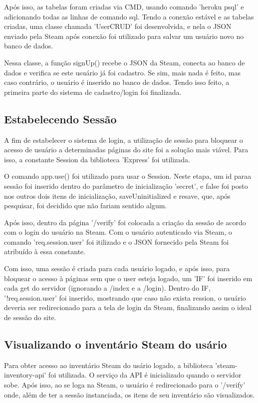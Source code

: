 Após isso, as tabelas foram criadas via CMD, usando comando 'heroku psql' e adicionando todas as linhas de comando sql.
Tendo a conexão estável e as tabelas criadas, uma classe chamada 'UserCRUD' foi desenvolvida, e nela o JSON 
enviado pela Steam após conexão foi utilizado para salvar um usuário novo no banco de dados.

Nessa classe, a função signUp() recebe o JSON da Steam, conecta ao banco de dados e verifica se este usuário 
já foi cadastro. Se sim, mais nada é feito, mas caso contrário, o usuário é inserido no banco de dados.
Tendo isso feito, a primeira parte do sistema de cadastro/login foi finalizada.

\subsection{Estabelecendo Sessão}
A fim de estabelecer o sistema de login, a utilização de sessão para bloquear o acesso de usuário a 
determinadas páginas do site foi a solução mais viável. Para isso, a constante Session da biblioteca 'Express' foi utilizada.

O comando app.use() foi utilizado para usar o Session. Neste etapa, um id paraa sessão foi inserido dentro do 
parâmetro de inicialização 'secret', e false foi posto nos outros dois itens de inicialização, saveUninitialized e resave, que, 
após pesquisar, foi decidido que não fariam sentido algum.

Após isso, dentro da página '/verify' foi colocada a criação da sessão de acordo com o login do usuário na Steam. 
Com o usuário autenticado via Steam, o comando 'req.session.user' foi itilizado e o JSON fornecido pela Steam 
foi atribuído à essa constante.

Com isso, uma sessão é criada para cada usuário logado, e após isso, para bloquear o acesso à páginas sem que o user 
esteja logado, um 'IF' foi inserido em cada get do servidor (ignorando a /index e a /login). Dentro do IF, 
'!req.session.user' foi inserido, mostrando que caso não exista ression, o usuário deveria ser redirecionado para a 
tela de login da Steam, finalizando assim o ideal de sessão do site. 

\subsection{Visualizando o inventário Steam do usário}
Para obter acesso ao inventário Steam do usário logado, a biblioteca 'steam-inventory-api' foi utilizada. 
O serviço da API é inicializado quando o servidor sobe. Após isso, ao se loga na Steam, o usuário é redirecionado para o '/verify' onde, 
além de ter a sessão instanciada, os itens de seu inventário são visualizados.

